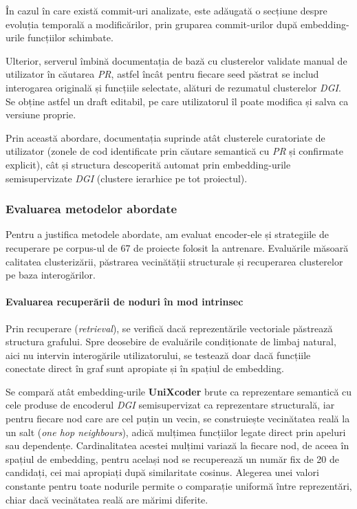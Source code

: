 \documentclass[12pt]{article}
\numberwithin{equation}{section}
\numberwithin{figure}{section}
\numberwithin{table}{section}
\theoremstyle{definition}
\theoremstyle{plain}
\begin{document}
În cazul în care există commit-uri analizate, este adăugată o secțiune despre evoluția temporală a modificărilor, prin gruparea commit-urilor după embedding-urile funcțiilor schimbate.

Ulterior, serverul îmbină documentația de bază cu clusterelor validate manual de utilizator în căutarea \textit{PR}, astfel încât pentru fiecare seed păstrat se includ interogarea originală și funcțiile selectate, alături de rezumatul clusterelor \textit{DGI}. Se obține astfel un draft editabil, pe care utilizatorul îl poate modifica și salva ca versiune proprie.

Prin această abordare, documentația suprinde atât clusterele curatoriate de utilizator (zonele de cod identificate prin căutare semantică cu \textit{PR} și confirmate explicit), cât și structura descoperită automat prin embedding-urile semisupervizate \textit{DGI} (clustere ierarhice pe tot proiectul).

\subsubsection{Evaluarea metodelor abordate}

Pentru a justifica metodele abordate, am evaluat encoder-ele și strategiile de recuperare pe corpus-ul de 67 de proiecte folosit la antrenare. Evaluările măsoară calitatea clusterizării, păstrarea vecinătății structurale și recuperarea clusterelor pe baza interogărilor.

\paragraph{Evaluarea recuperării de noduri în mod intrinsec}

Prin recuperare (\textit{retrieval}), se verifică dacă reprezentările vectoriale păstrează structura grafului. Spre deosebire de evaluările condiționate de limbaj natural, aici nu intervin interogările utilizatorului, se testează doar dacă funcțiile conectate direct în graf sunt apropiate și în spațiul de embedding.

Se compară atât embedding-urile \textbf{UniXcoder} brute ca reprezentare semantică cu cele produse de encoderul \textit{DGI} semisupervizat ca reprezentare structurală, iar pentru fiecare nod care are cel puțin un vecin, se construiește vecinătatea reală la un salt (\textit{one hop neighbours}), adică mulțimea funcțiilor legate direct prin apeluri sau dependențe. Cardinalitatea acestei mulțimi variază la fiecare nod, de aceea în spațiul de embedding, pentru același nod se recuperează un număr fix de 20 de candidați, cei mai apropiați după similaritate cosinus. Alegerea unei valori constante pentru toate nodurile permite o comparație uniformă între reprezentări, chiar dacă vecinătatea reală are mărimi diferite.
\end{document}
